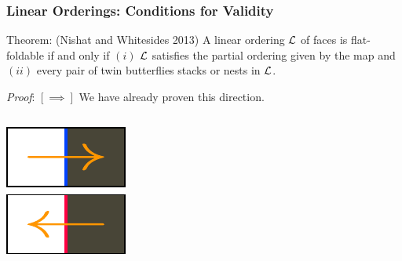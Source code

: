 \documentclass{beamer}
\begin{document}
\begin{frame}
\frametitle{Linear Orderings: Conditions for Validity}

\begin{block}{Theorem: (Nishat and Whitesides 2013)}
A linear ordering $\mathcal{L}$ of faces is flat-foldable if and only if $(i)$ $\mathcal{L}$ satisfies the partial ordering given by the map and $(ii)$ every pair of twin butterflies stacks or nests in $\mathcal{L}$. 
\end{block}

\medskip

\pause

\textit{Proof}: $[\implies]$ We have already proven this direction.

\medskip

\begin{columns}[c]

\pause

\includegraphics[width=\textwidth]{sam_images/checkerboard-tiles.pdf}

\pause


\end{columns}
\end{frame}
\end{document}
